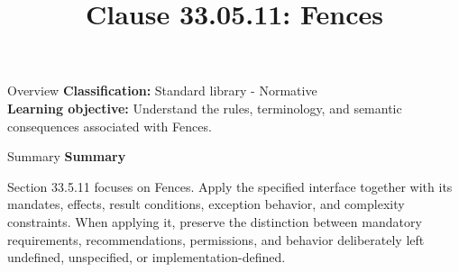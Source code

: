 \documentclass[10pt,letterpaper]{article}
\title{Clause 33.05.11: Fences}
\author{}
\date{}
\begin{document}
\maketitle
\begin{CornellOverviewBox}{Overview}
\textbf{Classification:} Standard library - Normative\\[2pt]
\textbf{Learning objective:} Understand the rules, terminology, and semantic consequences associated with Fences.
\end{CornellOverviewBox}\begin{CornellSummaryBox}{Summary}
{\sffamily\bfseries\color{Accent} Summary}\par\vspace{3pt}Section 33.5.11 focuses on Fences. Apply the specified interface together with its mandates, effects, result conditions, exception behavior, and complexity constraints. When applying it, preserve the distinction between mandatory requirements, recommendations, permissions, and behavior deliberately left undefined, unspecified, or implementation-defined.
\end{CornellSummaryBox}
\end{document}
